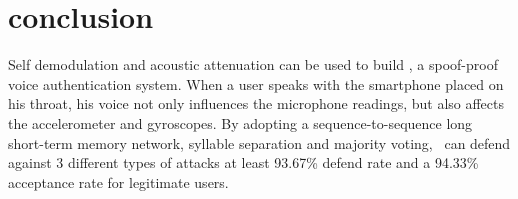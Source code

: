 \section{conclusion}

Self demodulation and acoustic attenuation can be used to build {\shortname}, a spoof-proof voice authentication system. When a user speaks with the smartphone placed on his throat, his voice not only influences the microphone readings, but also affects the accelerometer and gyroscopes. By adopting a sequence-to-sequence long short-term memory network, syllable separation and majority voting, \shortname~can defend against 3 different types of attacks at least 93.67\% defend rate and a 94.33\% acceptance rate for legitimate users.